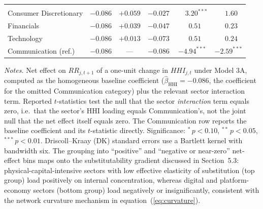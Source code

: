 \begin{table}[!htbp]
\begin{threeparttable}
\begin{tabular}{l c c c c c}
\addlinespace[4pt]
\multicolumn{6}{l}{\textit{Sectors with negative or near-zero net effect (consistent with $\sigma \approx 1$ regime)}} \\
\addlinespace[2pt]
Consumer Discretionary & $-0.086$ & $+0.059$ & $-0.027$ & $\phantom{-}3.20^{***}$ & $\phantom{-}1.60\phantom{^{*}}$ \\
Financials             & $-0.086$ & $+0.039$ & $-0.047$ & $\phantom{-}0.51\phantom{^{*}}$ & $\phantom{-}0.23\phantom{^{*}}$ \\
Technology             & $-0.086$ & $+0.013$ & $-0.073$ & $\phantom{-}0.51\phantom{^{*}}$ & $\phantom{-}0.24\phantom{^{*}}$ \\
Communication (ref.)   & $-0.086$ &  ---     & $-0.086$ & $-4.94^{***}$ & $-2.59^{***}$ \\
\bottomrule
\end{tabular}

\begin{tablenotes}[flushleft]
\footnotesize
\item \textit{Notes.} Net effect on $RR_{j,t+1}$ of a one-unit change in $HHI_{j,t}$
under Model 3A, computed as the homogeneous baseline coefficient
($\hat{\beta}_{\text{HHI}} = -0.086$, the coefficient for the omitted
Communication category) plus the relevant sector interaction term. Reported
$t$-statistics test the null that the sector \emph{interaction} term equals
zero, i.e.\ that the sector's HHI loading equals Communication's, not the
joint null that the net effect itself equals zero. The Communication row
reports the baseline coefficient and its $t$-statistic directly. Significance:
$^{*}\,p<0.10$, $^{**}\,p<0.05$, $^{***}\,p<0.01$. Driscoll--Kraay
(DK) standard errors use a Bartlett kernel with bandwidth six. The grouping
into ``positive'' and ``negative or near-zero'' net-effect bins maps onto the
substitutability gradient discussed in Section~5.3: physical-capital-intensive
sectors with low effective elasticity of substitution (top group) load
positively on internal concentration, whereas digital and platform-economy
sectors (bottom group) load negatively or insignificantly, consistent with
the network curvature mechanism in equation~(\ref{eq:curvature}).
\end{tablenotes}
\end{threeparttable}

\end{table}
